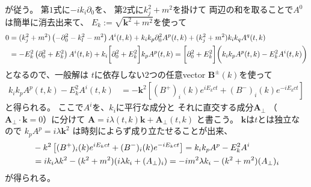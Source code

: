 が従う。
第$1$式に$- i k_i \partial_0$を、
第$2$式に$k_j^2 + m^2$を掛けて
両辺の和を取ることで$A^0$は簡単に消去出来て、
$E_k := \sqrt{\bm{k}^2 + m^2}$を使って
\begin{align}
    0
&=
    (k_j^2 + m^2)
    \left(
        - \partial_0^2
        - k_l^2
        - m^2
    \right)
    A^i (t, k)
+
    k_i k_p
    \partial_0^2
    A^p (t, k)
+
    (k_j^2 + m^2)
    k_i k_q
    A^q (t, k)
\notag\\&
=
    - E_k^2
    \left(
        \partial_0^2
        + E_k^2
    \right)
    A^i (t, k)
+
    k_i
    \bigg[
        \partial_0^2
    +
        E_k^2
    \bigg]
    k_p A^p (t, k)
=
    \bigg[
        \partial_0^2
    +
        E_k^2
    \bigg]
    \bigg(
        k_i
        k_p A^p (t, k)
    -
        E_k^2
        A^i (t, k)
    \bigg)
\end{align}
となるので、一般解は
$t$に依存しない$2$つの任意vector
$\bm{B}^\pm (k)$を使って
\begin{align}
    k_i
    k_p A^p (t, k)
-
    E_k^2
    A^i (t, k)
&=
    - \bm{k}^2
    \left[
        (B^+)_i (k) e^{i E_k c t}
    +
        (B^-)_i (k) e^{- i E_k c t}
    \right]
\end{align}
と得られる。
ここで$A^i$を、$k_i$に平行な成分と
それに直交する成分$\bm{A}_\perp$
（$\bm{A}_\perp \cdot \bm{k} = 0$）に分けて
$\bm{A} = i \lambda (t, k) \bm{k}
+ \bm{A}_\perp(t, k)$
と書こう。
$\bm{k}$は$t$とは独立なので
$k_p A^p = i \lambda \bm{k}^2$
は時刻によらず成り立たせることが出来、
\begin{align}
    &
    - k^2
    \left[
        (B^+)_i (k) e^{i E_k c t}
    +
        (B^-)_i (k) e^{- i E_k c t}
    \right]
=
    k_i k_p A^p
-
    E_k^2
    A^i
\notag\\&
=
    i k_i
    \lambda k^2
-
    (k^2 + m^2)
    (i \lambda k_i
    + (A_\perp)_i )
=
    - i m^2
    \lambda k_i
    -
    (k^2 + m^2)
    (A_\perp)_i
\label{free vec field eom general sol decomposed}
\end{align}
が得られる。


